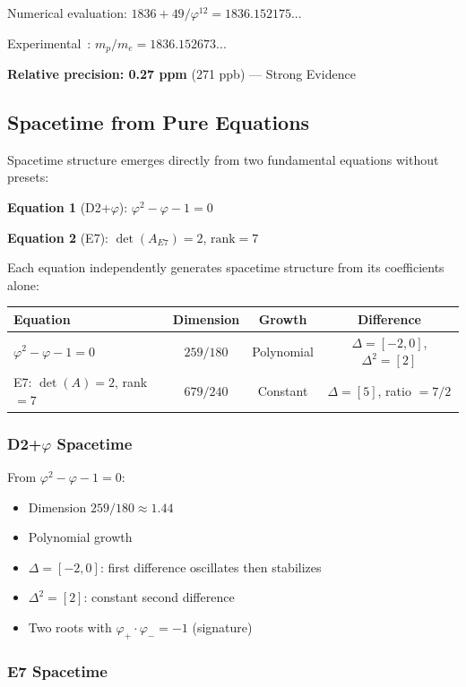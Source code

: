 \documentclass[11pt,a4paper]{article}
\begin{document}
Numerical evaluation: $1836 + 49/\varphi^{12} = 1836.152175...$

Experimental~\cite{CODATA2022}: $m_p/m_e = 1836.152673...$

\textbf{Relative precision: 0.27 ppm} (271 ppb) --- Strong Evidence

\subsection{Spacetime from Pure Equations}

Spacetime structure emerges directly from two fundamental equations without presets:

\textbf{Equation 1} (D2+$\varphi$): $\varphi^2 - \varphi - 1 = 0$

\textbf{Equation 2} (E7): $\det(A_{E7}) = 2$, $\text{rank} = 7$

Each equation independently generates spacetime structure from its coefficients alone:
\begin{center}
\begin{tabular}{|l|c|c|c|}
\hline
\textbf{Equation} & \textbf{Dimension} & \textbf{Growth} & \textbf{Difference} \\
\hline
$\varphi^2 - \varphi - 1 = 0$ & $259/180$ & Polynomial & $\Delta = [-2, 0]$, $\Delta^2 = [2]$ \\
E7: $\det(A)=2$, rank$=7$ & $679/240$ & Constant & $\Delta = [5]$, ratio $= 7/2$ \\
\hline
\end{tabular}
\end{center}

\subsubsection{D2+$\varphi$ Spacetime}

From $\varphi^2 - \varphi - 1 = 0$:
\begin{itemize}
\item Dimension $259/180 \approx 1.44$
\item Polynomial growth
\item $\Delta = [-2, 0]$: first difference oscillates then stabilizes
\item $\Delta^2 = [2]$: constant second difference
\item Two roots with $\varphi_+ \cdot \varphi_- = -1$ (signature)
\end{itemize}

\subsubsection{E7 Spacetime}
\end{document}
